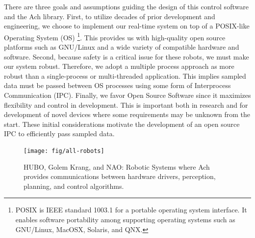 \documentclass[letterpaper]{IEEEtran}
\begin{document}



There are three goals and assumptions guiding the design of this
control software and the Ach library. First, to utilize decades of
prior development and engineering, we choose to implement our
real-time system on top of a POSIX-like Operating System (OS)
\footnote{POSIX is IEEE standard 1003.1 for a portable operating
  system interface.  It enables software portability among supporting
  operating systems such as GNU/Linux, MacOSX, Solaris, and
  QNX.}. This provides us with high-quality open source platforms such
as GNU/Linux and a wide variety of compatible hardware and software.
Second, because safety is a critical issue for these robots, we must
make our system robust.  Therefore, we adopt a multiple process
approach as more robust than a single-process or multi-threaded
application.  This implies sampled data must be passed between OS
processes using some form of Interprocess Communication
(IPC). Finally, we favor Open Source Software since it maximizes
flexibility and control in development. This is important both in
research and for development of novel devices where some requirements
may be unknown from the start. These initial considerations motivate
the development of an open source IPC to efficiently pass sampled
data.


\begin{figure}[t]
    \texttt{[image: fig/all-robots]}
    \caption{HUBO, Golem Krang, and NAO: Robotic Systems where Ach
      provides communications between hardware drivers, perception,
      planning, and control algorithms.}
    \label{fig:app}
\end{figure}
\end{document}
